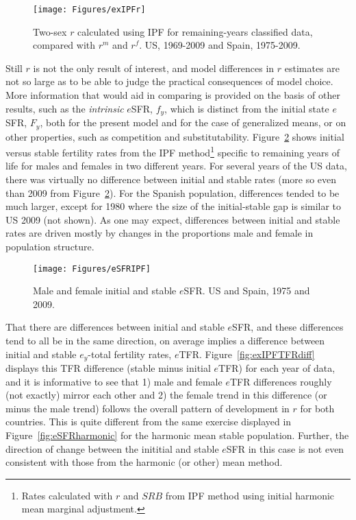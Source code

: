  \begin{figure}[ht!]
        \centering  
          \caption{Two-sex $r$ calculated using IPF for remaining-years
          classified data, compared with $r^m$ and $r^f$. US, 1969-2009 and
          Spain, 1975-2009.}
           \texttt{[image: Figures/exIPFr]}
          \label{fig:exIPFr}
\end{figure}

Still $r$ is not the only result of interest, and model differences in $r$
estimates are not so large as to be able to judge the practical consequences of
model choice. More information that would aid in comparing is provided on the
basis of other results, such as the \textit{intrinsic} $e$SFR, $f_y$, which is
distinct from the initial state $e$SFR, $F_y$, both for the present model and
for the case of generalized means, or on other properties, such as competition
and substitutability. Figure~\ref{fig:eSFRIPF} shows initial versus stable
fertility rates from the IPF method\footnote{Rates calculated with $r$
and $SRB$ from IPF method using initial harmonic mean marginal adjustment.}
specific to remaining years of life for males and females in two different years. 
For several years of the US data, there was virtually no difference between initial 
and stable rates (more so even than 2009 from Figure~\ref{fig:eSFRIPF}). For
the Spanish population, differences tended to be much larger, except for 1980
where the size of the initial-stable gap is similar to US 2009 (not shown). As
one may expect, differences between initial and stable rates are driven mostly 
by changes in the proportions male and female in population structure. 

\begin{figure}[ht!]
        \centering  
          \caption{Male and female initial and stable $e$SFR. US and
          Spain, 1975 and 2009.}
           \texttt{[image: Figures/eSFRIPF]}
          \label{fig:eSFRIPF}
\end{figure}

That there are differences between initial and stable $e$SFR, and these
differences tend to all be in the same direction, on average implies a
difference between initial and stable $e_y$-total fertility rates, $e$TFR. Figure~\ref{fig:exIPFTFRdiff} displays this TFR difference (stable minus
initial $e$TFR) for each year of data, and it is informative to see that 1)
male and female $e$TFR differences roughly (not exactly) mirror each other and
2) the female trend in this difference (or minus the male trend) follows the
overall pattern of development in $r$ for both countries. This is quite
different from the same exercise displayed in Figure~\ref{fig:eSFRharmonic} for
the harmonic mean stable population. Further, the direction of change between
the inititial and stable $e$SFR in this case is not even consistent with those
from the harmonic (or other) mean method.

